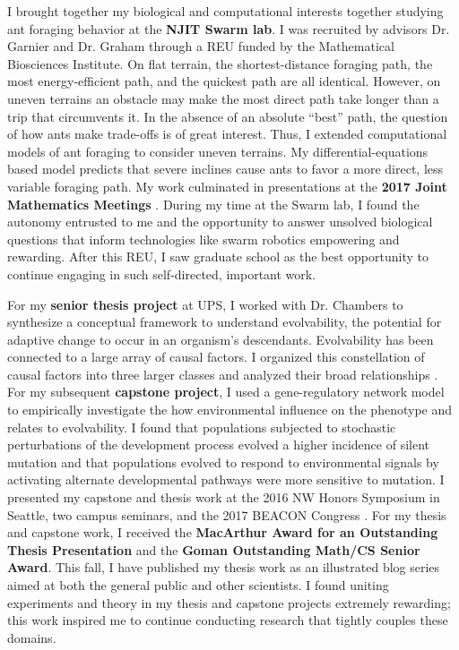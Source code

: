 I brought together my biological and computational interests together studying ant foraging behavior at the \textbf{NJIT Swarm lab}.
I was recruited by advisors Dr. Garnier and Dr. Graham through a REU funded by the Mathematical Biosciences Institute.
On flat terrain, the shortest-distance foraging path, the most energy-efficient path, and the quickest path are all identical.
However, on uneven terrains an obstacle may make the most direct path take longer than a trip that circumvents it.
In the absence of an absolute ``best'' path, the question of how ants make trade-offs is of great interest.
Thus, I extended computational models of ant foraging to consider uneven terrains.
My differential-equations based model predicts that severe inclines cause ants to favor a more direct, less variable foraging path.
My work culminated in presentations at the \textbf{2017 Joint Mathematics Meetings} \cite{jmm}.
During my time at the Swarm lab, I found the autonomy entrusted to me and the opportunity to answer unsolved biological questions that inform technologies like swarm robotics empowering and rewarding.
After this REU, I saw graduate school as the best opportunity to continue engaging in such self-directed, important work.

For my \textbf{senior thesis project} at UPS, I worked with Dr. Chambers to synthesize a conceptual framework to understand evolvability, the potential for adaptive change to occur in an organism's descendants.
Evolvability has been connected to a large array of causal factors.
I organized this constellation of causal factors into three larger classes and analyzed their broad relationships \cite{thesis}.
For my subsequent \textbf{capstone project}, I used a gene-regulatory network model to empirically investigate the how environmental influence on the phenotype and relates to evolvability.
I found that populations subjected to stochastic perturbations of the development process evolved a higher incidence of silent mutation and that populations evolved to respond to environmental signals by activating alternate developmental pathways were more sensitive to mutation.
I presented my capstone and thesis work at the 2016 NW Honors Symposium in Seattle, two campus seminars, and the 2017 BEACON Congress \cite{beacon}.
For my thesis and capstone work, I received the \textbf{MacArthur Award for an Outstanding Thesis Presentation} and the \textbf{Goman Outstanding Math/CS Senior Award}.
This fall, I have published my thesis work as an illustrated blog series aimed at both the general public and other scientists.
I found uniting experiments and theory in my thesis and capstone projects extremely rewarding;
this work inspired me to continue conducting research that tightly couples these domains.
